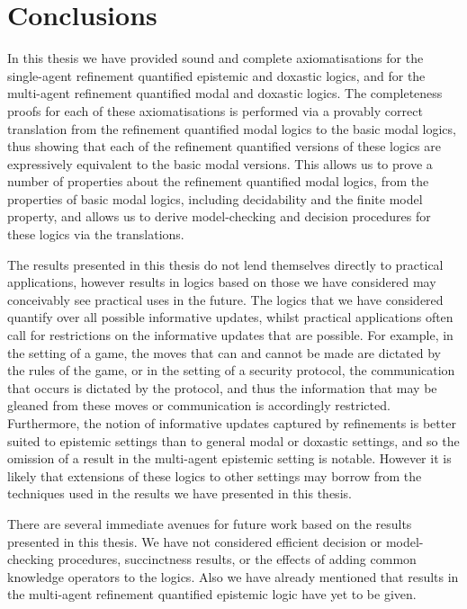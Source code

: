 \chapter{Conclusions}

In this thesis we have provided sound and complete axiomatisations for the
single-agent refinement quantified epistemic and doxastic logics, and for the
multi-agent refinement quantified modal and doxastic logics. The completeness
proofs for each of these axiomatisations is performed via a provably correct
translation from the refinement quantified modal logics to the basic modal
logics, thus showing that each of the refinement quantified versions of these
logics are expressively equivalent to the basic modal versions. This allows us
to prove a number of properties about the refinement quantified modal logics,
from the properties of basic modal logics, including decidability and the finite
model property, and allows us to derive model-checking and decision procedures
for these logics via the translations.

The results presented in this thesis do not lend themselves directly to
practical applications, however results in logics based on those we have
considered may conceivably see practical uses in the future. The logics that we
have considered quantify over all possible informative updates, whilst practical
applications often call for restrictions on the informative updates that are
possible. For example, in the setting of a game, the moves that can and cannot
be made are dictated by the rules of the game, or in the setting of a security
protocol, the communication that occurs is dictated by the protocol, and thus
the information that may be gleaned from these moves or communication is
accordingly restricted. Furthermore, the notion of informative updates captured
by refinements is better suited to epistemic settings than to general modal or
doxastic settings, and so the omission of a result in the multi-agent epistemic
setting is notable. However it is likely that extensions of these logics to
other settings may borrow from the techniques used in the results we have
presented in this thesis.

There are several immediate avenues for future work based on the results
presented in this thesis. We have not considered efficient decision or
model-checking procedures, succinctness results, or the effects of adding common
knowledge operators to the logics. Also we have already mentioned that results
in the multi-agent refinement quantified epistemic logic have yet to be given.

